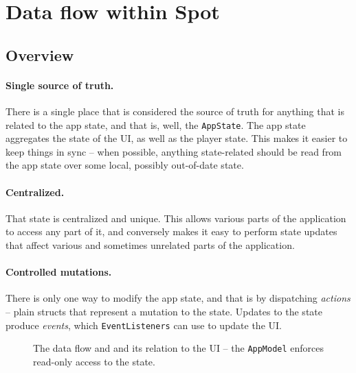 \documentclass[12pt, a4paper]{article}
\begin{document}
\section{Data flow within Spot}

\subsection{Overview}

\paragraph{Single source of truth.} There is a single place that is considered the source of truth for anything that is related to the app state, and that is, well, the \texttt{AppState}. The app state aggregates the state of the UI, as well as the player state. This makes it easier to keep things in sync -- when possible, anything state-related should be read from the app state over some local, possibly out-of-date state.

\paragraph{Centralized.} That state is centralized and unique. This allows various parts of the application to access any part of it, and conversely makes it easy to perform state updates that affect various and sometimes unrelated parts of the application.

\paragraph{Controlled mutations.} There is only one way to modify the app state, and that is by dispatching \emph{actions} -- plain structs that represent a mutation to the state. Updates to the state produce \emph{events}, which \texttt{EventListeners} can use to update the UI.

\begin{figure}[!h]

    \centering


    \caption{The data flow and and its relation to the UI -- the \texttt{AppModel} enforces read-only access to the state.}
    \label{fig:flow}

\end{figure}
\end{document}

